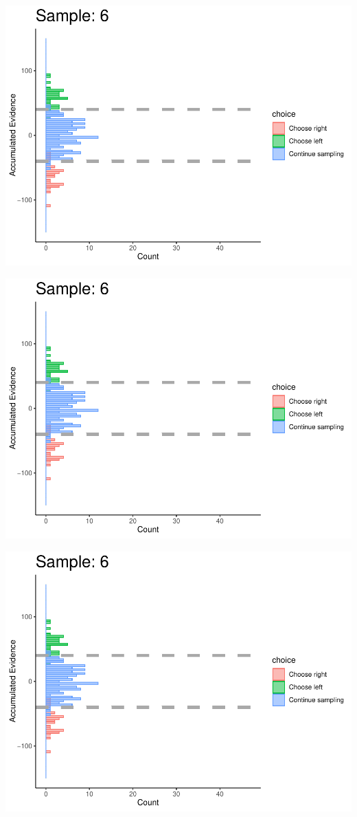 \documentclass[
]{book}
\begin{document}
\begin{center}\includegraphics[width=0.8\linewidth]{LateNightBayes_files/figure-latex/collapsing_check-53} \end{center}

\begin{center}\includegraphics[width=0.8\linewidth]{LateNightBayes_files/figure-latex/collapsing_check-54} \end{center}

\begin{center}\includegraphics[width=0.8\linewidth]{LateNightBayes_files/figure-latex/collapsing_check-55} \end{center}
\end{document}
